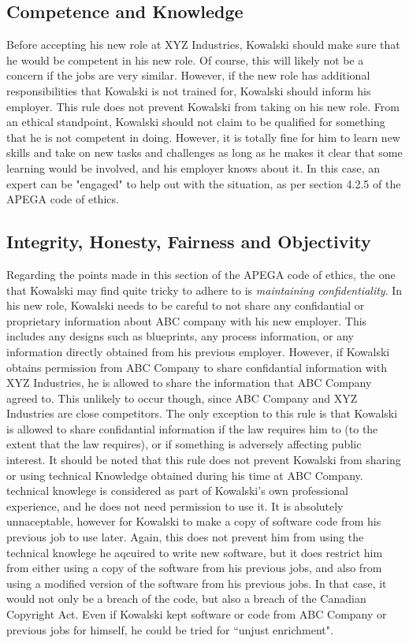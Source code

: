 \documentclass[letterpaper,12pt]{article}
\begin{document}
\subsection{Competence and Knowledge}
Before accepting his new role at XYZ Industries, Kowalski should make sure that he would be competent in his new role.
Of course, this will likely not be a concern if the jobs are very similar. However, if the new role has additional responsibilities that Kowalski
is not trained for, Kowalski should inform his employer. This rule does not prevent Kowalski from taking on his new role. From an ethical standpoint,
Kowalski should not claim to be qualified for something that he is not competent in doing. However, it is totally fine for him to learn new skills and take on
new tasks and challenges as long as he makes it clear that some learning would be involved, and his employer knows about it. In this case, an expert can be "engaged"
to help out with the situation, as per section 4.2.5 of the APEGA code of ethics.\cite{apegacode}

\subsection{Integrity, Honesty, Fairness and Objectivity}
Regarding the points made in this section of the APEGA code of ethics, the one that Kowalski may find quite tricky to
adhere to is \textit{maintaining confidentiality}. In his new role, Kowalski needs to be careful to not share
any confidantial or proprietary information about ABC company with his new employer. This includes any designs such as blueprints,
any process information, or any information directly obtained from his previous employer. However, if Kowalski obtains permission from ABC Company to share
confidantial information with XYZ Industries, he is allowed to share the information that ABC Company agreed to. This unlikely to occur though,
since ABC Company and XYZ Industries are close competitors. The only exception to this rule is that Kowalski is allowed to share confidantial information 
if the law requires him to (to the extent that the law requires), or if something is adversely affecting public interest. It should be noted that this
rule does not prevent Kowalski from sharing or using technical Knowledge obtained during his time at ABC Company. technical knowlege is considered as part of
Kowalski's own professional experience, and he does not need permission to use it. It is absolutely unnaceptable, however for Kowalski to make a copy of
software code from his previous job to use later. Again, this does not prevent him from using the technical knowlege he aqcuired to write new software, 
but it does restrict him from either using a copy of the software from his previous jobs, and also from using a modified version of the software
from his previous jobs. In that case, it would not only be a breach of the code, but also a breach of the Canadian Copyright Act\cite{copyrightact}.
Even if Kowalski kept software or code from ABC Company or previous jobs for himself, he could be tried for ``unjust enrichment".\cite{apegacode}
\end{document}
